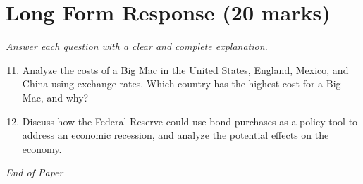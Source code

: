 \documentclass[12pt]{article}
\begin{document}
\section*{Long Form Response (20 marks)}
\textit{Answer each question with a clear and complete explanation.}
\begin{enumerate}[label=\arabic*.]
\setcounter{enumi}{10}
\item Analyze the costs of a Big Mac in the United States, England, Mexico, and China using exchange rates. Which country has the highest cost for a Big Mac, and why?
\item Discuss how the Federal Reserve could use bond purchases as a policy tool to address an economic recession, and analyze the potential effects on the economy.
\end{enumerate}

\vfill
\noindent\textit{End of Paper}
\end{document}

